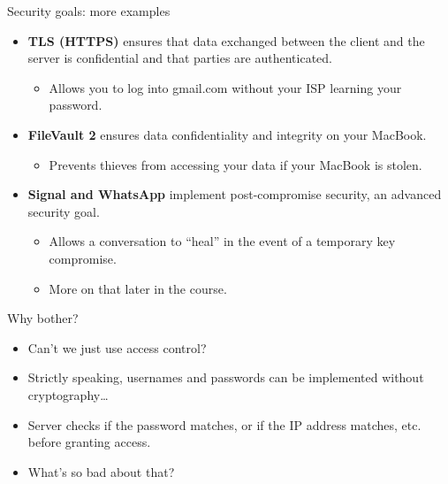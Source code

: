 \documentclass[aspectratio=169, lualatex, handout]{beamer}
\begin{document}
\begin{frame}{Security goals: more examples}
	\begin{itemize}[<+->]
		\item \textbf{TLS (HTTPS)} ensures that data exchanged between the client
		      and the server is confidential and that parties are authenticated.
		      \begin{itemize}
			      \item Allows you to log into gmail.com without your ISP learning your password.
		      \end{itemize}
		\item \textbf{FileVault 2} ensures data confidentiality and integrity on
		      your MacBook.
		      \begin{itemize}
			      \item Prevents thieves from accessing your data if your MacBook is stolen.
		      \end{itemize}
		\item \textbf{Signal and WhatsApp} implement post-compromise security, an advanced security
		      goal.
		      \begin{itemize}
			      \item Allows a conversation to ``heal'' in the event of a temporary key
			            compromise.
			      \item More on that later in the course.
		      \end{itemize}
	\end{itemize}
\end{frame}

\begin{frame}{Why bother?}
	\begin{itemize}[<+->]
		\item Can't we just use access control?
		\item Strictly speaking, usernames and passwords can be implemented
		      without cryptography\ldots
		\item Server checks if the password matches, or if the IP address matches,
		      etc. before granting access.
		\item What's so bad about that?
	\end{itemize}
\end{frame}
\end{document}
